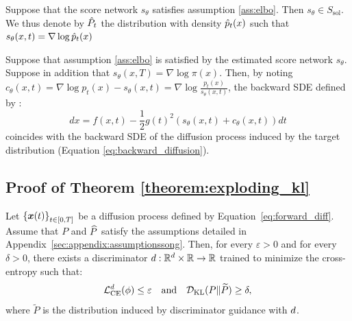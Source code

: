 \begin{theorem}\citep{kim2023refininggenerativeprocessdiscriminator}
    Suppose that the score network $s_{\theta}$ satisfies assumption \ref{ass:elbo}. Then $s_{\theta} \in S_{\mathrm{sol}}$. We thus denote by $\Hat{P}_{t}$ the distribution with density $\Hat{p}_{t}(x)$ such that $s_{\theta}(x,t) = \nabla \log \Hat{p}_{t}(x)$
\end{theorem}



\begin{theorem}\citep{kim2023refininggenerativeprocessdiscriminator}
Suppose that assumption \ref{ass:elbo} is satisfied by the estimated score network $s_{\theta}$. Suppose in addition that $s_{\theta}(x,T) = \nabla \log \pi(x)$.
Then, by noting $c_{\theta}(x,t) = \nabla \log p_{t}(x) - s_{\theta}(x,t) = \nabla \log \frac{p_{t}(x)}{s_{\theta}(x,t)}$, the backward SDE defined by : 
\begin{equation}\label{eq:refined_backward_SDE}
    dx = f(x,t) - \frac{1}{2}g(t)^{2}(s_{\theta}(x,t) + c_{\theta}(x,t))dt
\end{equation}
coincides with the backward SDE of the diffusion process induced by the target distribution (Equation \ref{eq:backward_diffusion}).  
\end{theorem}



\subsection{Proof of Theorem \ref{theorem:exploding_kl}}\label{app:sec:proofsuboptimal}



\begin{theorem*}
    Let $\left\{\boldsymbol{x}(t)\right\}_{t\in[0, T]}$ be a diffusion process defined by Equation~\eqref{eq:forward_diff}. Assume that $P$ and $\widehat P$ satisfy the assumptions detailed in Appendix~\ref{sec:appendix:assumptionssong}. Then, for every $\varepsilon>0$ and for every $\delta>0$, there exists a discriminator $d:\mathbb{R}^d\times\mathbb{R}\to\mathbb{R}$ trained to minimize the cross-entropy such that:
\begin{equation}
    \mathcal{L}_{\mathrm{CE}}^{d}(\phi)\leq \varepsilon \quad \mbox{and} \quad \mathcal{D}_{\mathrm{KL}}(P\Vert \widetilde{P}) \geq \delta,
\end{equation}
where $\widetilde{P}$ is the distribution induced by discriminator guidance with $d$.
\end{theorem*}



